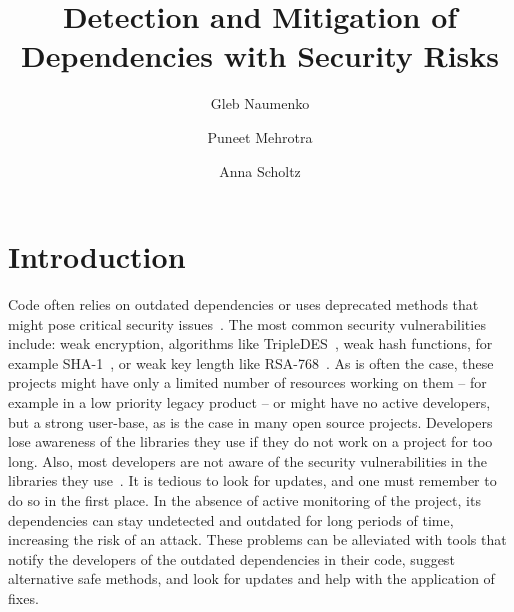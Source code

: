 \documentclass[sigconf]{acmart}
\begin{document}
\title{Detection and Mitigation of Dependencies with Security Risks}


\author{Gleb Naumenko}


\author{Puneet Mehrotra}


\author{Anna Scholtz}









\maketitle

\section{Introduction}

Code often relies on outdated dependencies or uses deprecated methods that might pose critical security issues~\cite{kula2017developers}. The most common security vulnerabilities include: weak encryption, algorithms like TripleDES~\cite{CA5350}, weak hash functions, for example SHA-1~\cite{CA5350}, or weak key length like RSA-768~\cite{kleinjung2010factorization}.
As is often the case, these projects might have only a limited number of resources working on them -- for example in a low priority legacy product -- or might have no active developers, but a strong user-base, as is the case in many open source projects. Developers lose awareness of the libraries they use if they do not work on a project for too long. Also, most developers are not aware of the security vulnerabilities in the libraries they use~\cite{kula2017developers}. It is tedious to look for updates, and one must remember to do so in the first place. In the absence of active monitoring of the project, its dependencies can stay undetected and outdated for long periods of time, increasing the risk of an attack. These problems can be alleviated with tools that notify the developers of the outdated dependencies in their code, suggest alternative safe methods, and look for updates and help with the application of fixes.
\end{document}
